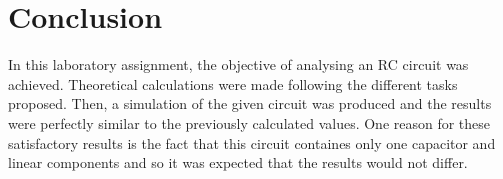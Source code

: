 \section{Conclusion}
\label{sec:conclusion}

In this laboratory assignment, the objective of analysing an RC circuit was achieved. Theoretical calculations were made following the different tasks proposed. Then, a simulation of the given circuit was produced and the results were perfectly similar to the previously calculated values.
One reason for these satisfactory results is the fact that this circuit containes only one capacitor and linear components and so it was expected that the results would not differ.

